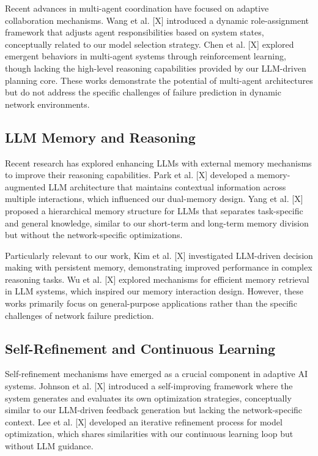 \documentclass[conference]{IEEEtran}
\begin{document}
Recent advances in multi-agent coordination have focused on adaptive collaboration mechanisms. Wang et al. [X] introduced a dynamic role-assignment framework that adjusts agent responsibilities based on system states, conceptually related to our model selection strategy. Chen et al. [X] explored emergent behaviors in multi-agent systems through reinforcement learning, though lacking the high-level reasoning capabilities provided by our LLM-driven planning core. These works demonstrate the potential of multi-agent architectures but do not address the specific challenges of failure prediction in dynamic network environments.

\subsection{LLM Memory and Reasoning}
Recent research has explored enhancing LLMs with external memory mechanisms to improve their reasoning capabilities. Park et al. [X] developed a memory-augmented LLM architecture that maintains contextual information across multiple interactions, which influenced our dual-memory design. Yang et al. [X] proposed a hierarchical memory structure for LLMs that separates task-specific and general knowledge, similar to our short-term and long-term memory division but without the network-specific optimizations.

Particularly relevant to our work, Kim et al. [X] investigated LLM-driven decision making with persistent memory, demonstrating improved performance in complex reasoning tasks. Wu et al. [X] explored mechanisms for efficient memory retrieval in LLM systems, which inspired our memory interaction design. However, these works primarily focus on general-purpose applications rather than the specific challenges of network failure prediction.

\subsection{Self-Refinement and Continuous Learning}
Self-refinement mechanisms have emerged as a crucial component in adaptive AI systems. Johnson et al. [X] introduced a self-improving framework where the system generates and evaluates its own optimization strategies, conceptually similar to our LLM-driven feedback generation but lacking the network-specific context. Lee et al. [X] developed an iterative refinement process for model optimization, which shares similarities with our continuous learning loop but without LLM guidance.
\end{document}
